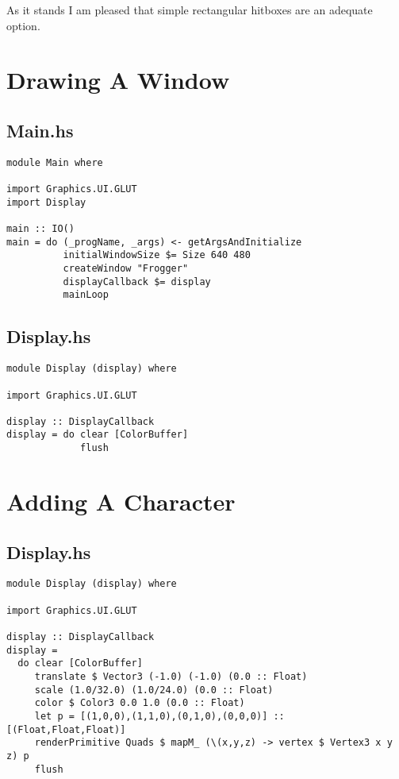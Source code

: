 \documentclass[12pt, a4paper]{report}
\begin{document}
As it stands I am pleased that simple rectangular hitboxes are an adequate option.

\pagebreak
%
%
\appendix

\section{Drawing A Window}
\subsection{Main.hs}
\begin{lstlisting}
module Main where

import Graphics.UI.GLUT
import Display

main :: IO()
main = do (_progName, _args) <- getArgsAndInitialize
          initialWindowSize $= Size 640 480
          createWindow "Frogger"
          displayCallback $= display
          mainLoop
\end{lstlisting}

\subsection{Display.hs}
\begin{lstlisting}
module Display (display) where

import Graphics.UI.GLUT

display :: DisplayCallback
display = do clear [ColorBuffer]
             flush
\end{lstlisting}

\section{Adding A Character}
\subsection{Display.hs}
\begin{lstlisting}
module Display (display) where

import Graphics.UI.GLUT

display :: DisplayCallback
display =
  do clear [ColorBuffer]
     translate $ Vector3 (-1.0) (-1.0) (0.0 :: Float)
     scale (1.0/32.0) (1.0/24.0) (0.0 :: Float)
     color $ Color3 0.0 1.0 (0.0 :: Float)
     let p = [(1,0,0),(1,1,0),(0,1,0),(0,0,0)] :: [(Float,Float,Float)]
     renderPrimitive Quads $ mapM_ (\(x,y,z) -> vertex $ Vertex3 x y z) p
     flush
\end{lstlisting}

\end{document}
